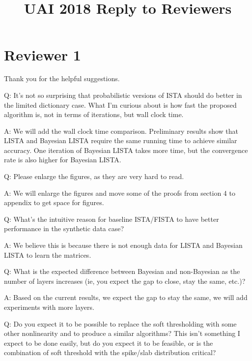 \documentclass{article}
\begin{document}
\title{UAI 2018 Reply to Reviewers}
\date{}
\maketitle

\section*{Reviewer 1}
Thank you for the helpful suggestions.

Q: It's not so surprising that probabilistic versions of ISTA should do better in the limited dictionary case. What I'm curious about is how fast the proposed algorithm is, not in terms of iterations, but wall clock time.

A: We will add the wall clock time comparison. Preliminary results show that LISTA and Bayesian LISTA require the same running time to achieve similar accuracy. One iteration of Bayesian LISTA takes more time, but the convergence rate is also higher for Bayesian LISTA.
\newline
\newline

Q: Please enlarge the figures, as they are very hard to read.

A: We will enlarge the figures and move some of the proofs from section 4 to appendix to get space for figures.
\newline
\newline

Q: What's the intuitive reason for baseline ISTA/FISTA to have better performance in the synthetic data case?

A: We believe this is because there is not enough data for LISTA and Bayesian LISTA to learn the matrices.
\newline
\newline

Q: What is the expected difference between Bayesian and non-Bayesian as the number of layers increases (ie, you expect the gap to close, stay the same, etc.)?

A: Based on the current results, we expect the gap to stay the same, we will add experiments with more layers.
\newline
\newline

Q: Do you expect it to be possible to replace the soft thresholding with some other nonlinearity and to produce a similar algorithms? This isn't something I expect to be done easily, but do you expect it to be feasible, or is the combination of soft threshold with the spike/slab distribution critical?
\end{document}

